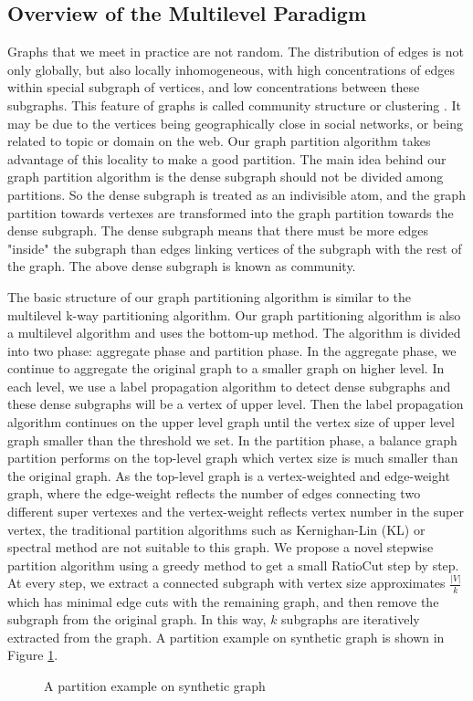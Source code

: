 \documentclass{acm_proc_article-sp}
\begin{document}
\subsection{Overview of the Multilevel Paradigm}
Graphs that we meet in practice are not random. The distribution of edges is not only globally, but also locally inhomogeneous, with high concentrations of edges within special subgraph of vertices, and low concentrations between these subgraphs. This feature of graphs is called community structure or clustering \cite{gn:community}. It may be due to the vertices being geographically close in social networks, or being related to topic or domain on the web. Our graph partition algorithm takes advantage of this locality to make a good partition. The main idea behind our graph partition algorithm is the dense subgraph should not be divided among partitions. So the dense subgraph is treated as an indivisible atom, and the graph partition towards vertexes are transformed into the graph partition towards the dense subgraph. The dense subgraph means that there must be more edges "inside" the subgraph than edges linking vertices of the subgraph with the rest of the graph. The above dense subgraph is known as community.
\par
The basic structure of our graph partitioning algorithm is similar to the multilevel k-way partitioning algorithm. Our graph partitioning algorithm is also a multilevel algorithm and uses the bottom-up method. The algorithm is divided into two phase: aggregate phase and partition phase. In the aggregate phase, we continue to aggregate the original graph to a smaller graph on higher level. In each level, we use a label propagation algorithm to detect dense subgraphs and these dense subgraphs will be a vertex of upper level. Then the label propagation algorithm continues on the upper level graph until the vertex size of upper level graph smaller than the threshold we set. In the partition phase, a balance graph partition performs on the top-level graph which vertex size is much smaller than the original graph. As the top-level graph is a vertex-weighted and edge-weight graph, where the edge-weight reflects the number of edges connecting two different super vertexes and the vertex-weight reflects vertex number in the super vertex, the traditional partition algorithms such as Kernighan-Lin (KL) or spectral method are not suitable to this graph\cite{kl:partition, barnard:mrsb}. We propose a novel stepwise partition algorithm using a greedy method to get a small RatioCut step by step. At every step, we extract a connected subgraph with vertex size approximates $\frac{|V|}{k}$ which has minimal edge cuts with the remaining graph, and then remove the subgraph from the original graph. In this way, $k$ subgraphs are iteratively extracted from the graph. A partition example on synthetic graph is shown in Figure \ref{fig:partition example}.
\begin{figure}
\centering
{}
\caption{A partition example on synthetic graph}
\label{fig:partition example}
\end{figure}
\end{document}
